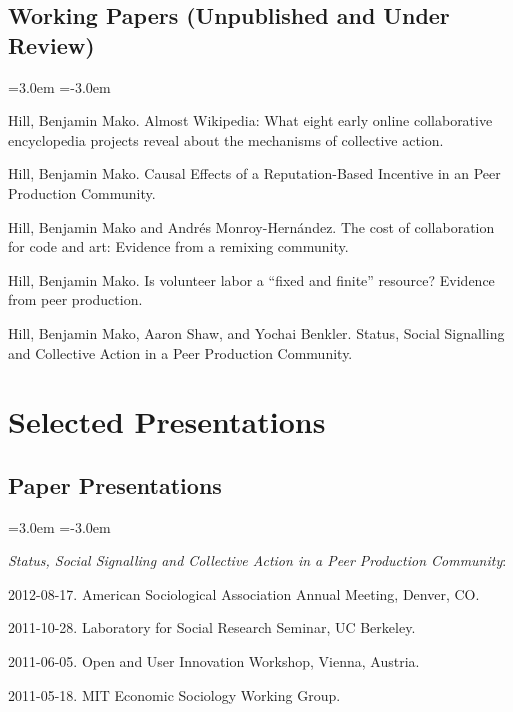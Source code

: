\documentclass[10pt]{article}
\newenvironment{cvlist}{
\begin{list}{}{\leftmargin=3.0em \itemindent=-3.0em}
  \setlength{\itemsep}{0pt}
  \setlength{\parskip}{0em}
  \setlength{\parsep}{1em}
  \setlength{\parindent}{0em}}
{\vspace{1em}
\end{list}}
\begin{document}
\subsection{Working Papers (Unpublished and Under Review)}
\begin{cvlist}
\item Hill, Benjamin Mako. Almost Wikipedia: What eight early online
  collaborative encyclopedia projects reveal about the mechanisms of
  collective action.
\item Hill, Benjamin Mako. Causal Effects of a Reputation-Based
  Incentive in an Peer Production Community.
\item Hill, Benjamin Mako and Andrés Monroy-Hernández. The cost of
  collaboration for code and art: Evidence from a remixing community.
\item Hill, Benjamin Mako. Is volunteer labor a ``fixed and finite''
  resource? Evidence from peer production.
\item Hill, Benjamin Mako, Aaron Shaw, and Yochai Benkler. Status,
  Social Signalling and Collective Action in a Peer Production
  Community.
\end{cvlist}

\section{Selected Presentations}

\subsection{Paper Presentations}

\begin{cvlist}
\item \emph{Status, Social Signalling and Collective Action in a Peer
  Production Community}:
\item 2012-08-17. American Sociological Association Annual Meeting, Denver, CO.
\item 2011-10-28. Laboratory for Social Research Seminar, UC Berkeley.
\item 2011-06-05. Open and User Innovation Workshop, Vienna, Austria.
\item 2011-05-18. MIT Economic Sociology Working Group.
\end{cvlist}
\end{document}
